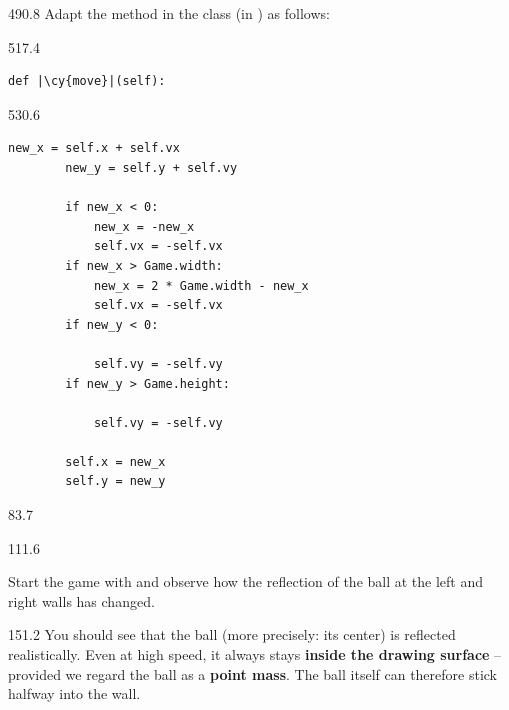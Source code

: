 \documentclass{aslab}
\newcommand*\cy[1]{\textcolor{codecyan}{#1}}
\begin{document}

\begin{region}{490.8}
Adapt the  method in the class  (in ) as
follows:
\end{region}

\begin{region}{517.4}
\begin{lstlisting}[style=pyn,firstnumber=13]
    def |\cy{move}|(self):
\end{lstlisting}
\end{region}

\begin{region}{530.6}
\begin{lstlisting}[style=pyn,firstnumber=14]
        new_x = self.x + self.vx
        new_y = self.y + self.vy

        if new_x < 0:
            new_x = -new_x
            self.vx = -self.vx
        if new_x > Game.width:
            new_x = 2 * Game.width - new_x
            self.vx = -self.vx
        if new_y < 0:

            self.vy = -self.vy
        if new_y > Game.height:

            self.vy = -self.vy

        self.x = new_x
        self.y = new_y
\end{lstlisting}
\end{region}

\nextpage
\begin{region}{83.7}
\end{region}

\begin{region}[pitch=13.2]{111.6}
\begin{ntasks}
\item Start the game with  and observe how the
  reflection of the ball at the left and right walls has changed.
\end{ntasks}
\end{region}

\begin{region}[x=74.7,right=0,pitch=14.15]{151.2}
You should see that the ball (more precisely: its center) is reflected
realistically. Even at high speed, it always stays \textbf{inside the drawing
surface} -- provided we regard the ball as a \textbf{point mass}. The ball
itself can therefore stick halfway into the wall.
\end{region}
\end{document}
